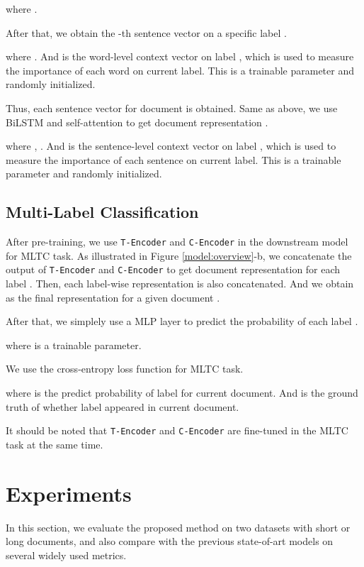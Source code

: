 \documentclass[runningheads]{llncs}
\begin{document}
where .

After that, we obtain the -th sentence vector  on a specific label .

where . And  is the word-level context vector on label , which is used to measure the importance of each word on current label. This is a trainable parameter and randomly initialized.

Thus, each sentence vector  for document  is obtained. Same as above, we use BiLSTM and self-attention to get document representation .

where , . And  is the sentence-level context vector on label , which is used to measure the importance of each sentence on current label. This is a trainable parameter and randomly initialized.

\subsection{Multi-Label Classification}
After pre-training, we use \texttt{T-Encoder} and \texttt{C-Encoder} in the downstream model for MLTC task. As illustrated in Figure \ref{model:overview}-b, we concatenate the output of \texttt{T-Encoder} and \texttt{C-Encoder} to get document representation for each label . Then, each label-wise representation is also concatenated. And we obtain  as the final representation for a given document .


After that, we simplely use a MLP layer to predict the probability of each label .

where  is a trainable parameter.

We use the cross-entropy loss function for MLTC task.

where  is the predict probability of label  for current document. And  is the ground truth of whether label  appeared in current document.

It should be noted that \texttt{T-Encoder} and \texttt{C-Encoder} are fine-tuned in the MLTC task at the same time.

\section{Experiments}
In this section, we evaluate the proposed method on two datasets with short or long documents, and also compare with the previous state-of-art models on several widely used metrics.
\end{document}
